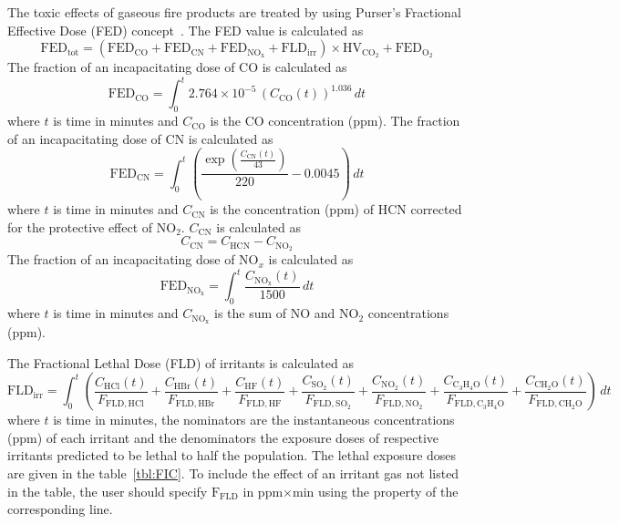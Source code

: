 \documentclass[12pt,a4paper,final,twoside]{stylevk}
\begin{document}
The toxic effects of gaseous fire products are treated by using
Purser's Fractional Effective Dose (FED) concept~\cite{Purser03}.  
The FED value is calculated as
%
\begin{equation}
  \mathrm{FED}_\mathrm{tot} = (\mathrm{FED}_\mathrm{CO} +
  \mathrm{FED}_\mathrm{CN} + \mathrm{FED}_\mathrm{NO_x} +
  \mathrm{FLD}_\mathrm{irr}) \times \mathrm{HV}_\mathrm{CO_2} +
  \mathrm{FED}_\mathrm{O_2}
\end{equation}
%
The fraction of an incapacitating dose of CO is calculated as
%
\begin{equation}
  \mathrm{FED}_\mathrm{CO} = \int_0^t 2.764 \times 10^{-5} \,
  (C_\mathrm{CO}(t))^{1.036} \, dt
\end{equation}
%
where $t$ is time in minutes and $C_\mathrm{CO}$ is the CO
concentration (ppm).  The fraction of an incapacitating dose of CN is
calculated as
%
\begin{equation}
  \mathrm{FED}_\mathrm{CN} = \int_0^t \left( \frac{\exp\left(
        \frac{C_\mathrm{CN}(t)}{43} \right)}{220} - 0.0045 \right) \,
  dt
\end{equation}
%
where $t$ is time in minutes and $C_\mathrm{CN}$ is the concentration
(ppm) of HCN corrected for the protective effect of NO$_\mathrm{2}$.
$C_\mathrm{CN}$ is calculated as
%
\begin{equation}
  C_\mathrm{CN} = C_\mathrm{HCN} - C_\mathrm{NO_2}
\end{equation}
%
The fraction of an incapacitating dose of NO$_x$ is calculated as
%
\begin{equation}
\mathrm{FED}_\mathrm{NO_x} = \int_0^t \frac{C_\mathrm{NO_x}(t)}{1500} \, dt
\end{equation}
%
where $t$ is time in minutes and $C_\mathrm{NO_x}$ is the sum of NO
and NO$_\mathrm{2}$ concentrations (ppm).

The Fractional Lethal Dose (FLD) of irritants is calculated as
%
\begin{equation}
  \mathrm{FLD}_\mathrm{irr} = \int_0^t \left(
    \frac{C_\mathrm{HCl}(t)}    {F_\mathrm{FLD,HCl}} +
    \frac{C_\mathrm{HBr}(t)}    {F_\mathrm{FLD,HBr}} +
    \frac{C_\mathrm{HF}(t)}     {F_\mathrm{FLD,HF}} +
    \frac{C_\mathrm{SO_2}(t)}   {F_\mathrm{FLD,SO_2}} +
    \frac{C_\mathrm{NO_2}(t)}   {F_\mathrm{FLD,NO_2}} +
    \frac{C_\mathrm{C_3H_4O}(t)}{F_\mathrm{FLD,C_3H_4O}} +
    \frac{C_\mathrm{CH_2O}(t)}  {F_\mathrm{FLD,CH_2O}}
    \right) \, dt
\end{equation}
%
where $t$ is time in minutes, the nominators are the instantaneous
concentrations (ppm) of each irritant and the denominators the
exposure doses of respective irritants predicted to be lethal to half
the population.  The lethal exposure doses~\cite{Purser03} are given
in the table~\ref{tbl:FIC}.  To include the effect of an irritant gas
not listed in the table, the user should specify $\mathrm{F_{FLD}}$ in
ppm$\times$min using the  property of the
corresponding  line.
\end{document}
